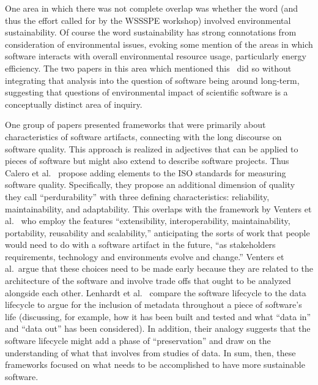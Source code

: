 \documentclass[11pt, oneside]{amsart}
\begin{document}
One area in which there was not complete overlap was whether the word
(and thus the effort called for by the WSSSPE workshop) involved
environmental sustainability. Of course the word sustainability has
strong connotations from consideration of environmental issues,
evoking some mention of the areas in which software interacts with
overall environmental resource usage, particularly energy efficiency.
The two papers in this area which mentioned
this~\cite{Venters_WSSSPE,Calero_WSSSPE} did so without integrating
that analysis into the question of software being around long-term,
suggesting that questions of environmental impact of scientific
software is a conceptually distinct area of inquiry.

One group of papers presented frameworks that were primarily about
characteristics of software artifacts, connecting with the long
discourse on software quality. This approach is realized in adjectives
that can be applied to pieces of software but might also extend to
describe software projects.  Thus Calero et al.~\cite{Calero_WSSSPE}
propose adding elements to the ISO standards for measuring software
quality. Specifically, they propose an additional dimension of quality
they call ``perdurability'' with
three defining characteristics: reliability, maintainability, and
adaptability. This overlaps with the framework   by
Venters et al.~\cite{Venters_WSSSPE} who employ the features
``extensibility, interoperability, maintainability, portability,
reusability and scalability,'' anticipating the sorts of work that
people would need to do with a software artifact in the future, ``as
stakeholders requirements, technology and environments evolve and
change.'' Venters et al.~argue that these choices need to be made 
early because they are related to the architecture of the software and
involve trade offs that ought to be analyzed alongside each other. Lenhardt et
al.~\cite{Lenhardt_WSSSPE} compare the software lifecycle to the data
lifecycle to argue for the inclusion of metadata throughout a piece of
software's life (discussing, for example, how it has been built and
tested and what ``data in'' and ``data out'' has been considered). In
addition, their analogy suggests that the software lifecycle might add
a phase of ``preservation'' and draw on the understanding of what that
involves from studies of data.  In sum, then, these frameworks focused
on what needs to be accomplished to have more sustainable software.
\end{document}
